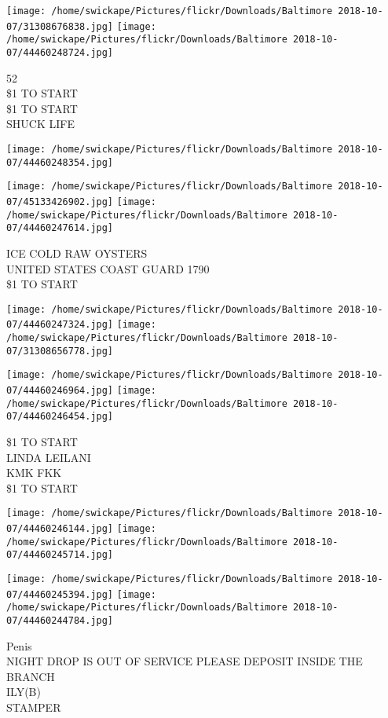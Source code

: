 \documentclass[10pt,letterpaper]{article}
\begin{document}
\texttt{[image: /home/swickape/Pictures/flickr/Downloads/Baltimore 2018-10-07/31308676838.jpg]}
\texttt{[image: /home/swickape/Pictures/flickr/Downloads/Baltimore 2018-10-07/44460248724.jpg]}

52\\
\$1 TO START\\
\$1 TO START\\
SHUCK LIFE
\pagebreak

\texttt{[image: /home/swickape/Pictures/flickr/Downloads/Baltimore 2018-10-07/44460248354.jpg]}

\vspace{0.25in}
\texttt{[image: /home/swickape/Pictures/flickr/Downloads/Baltimore 2018-10-07/45133426902.jpg]}
\texttt{[image: /home/swickape/Pictures/flickr/Downloads/Baltimore 2018-10-07/44460247614.jpg]}

ICE COLD RAW OYSTERS\\
UNITED STATES COAST GUARD 1790\\
\$1 TO START
\pagebreak

\texttt{[image: /home/swickape/Pictures/flickr/Downloads/Baltimore 2018-10-07/44460247324.jpg]}
\texttt{[image: /home/swickape/Pictures/flickr/Downloads/Baltimore 2018-10-07/31308656778.jpg]}

\texttt{[image: /home/swickape/Pictures/flickr/Downloads/Baltimore 2018-10-07/44460246964.jpg]}
\texttt{[image: /home/swickape/Pictures/flickr/Downloads/Baltimore 2018-10-07/44460246454.jpg]}

\$1 TO START\\
LINDA LEILANI\\
KMK FKK\\
\$1 TO START
\pagebreak

\texttt{[image: /home/swickape/Pictures/flickr/Downloads/Baltimore 2018-10-07/44460246144.jpg]}
\texttt{[image: /home/swickape/Pictures/flickr/Downloads/Baltimore 2018-10-07/44460245714.jpg]}

\texttt{[image: /home/swickape/Pictures/flickr/Downloads/Baltimore 2018-10-07/44460245394.jpg]}
\texttt{[image: /home/swickape/Pictures/flickr/Downloads/Baltimore 2018-10-07/44460244784.jpg]}

Penis\\
NIGHT DROP IS OUT OF SERVICE PLEASE DEPOSIT INSIDE THE BRANCH\\
ILY(B)\\
STAMPER
\pagebreak
\end{document}
